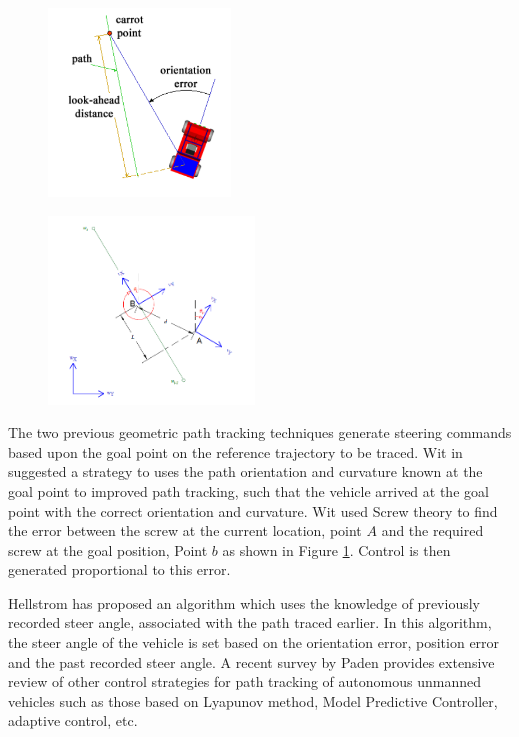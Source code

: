  \begin{figure}
	\centering
	\begin{minipage}{.5\textwidth}
		\centering
		\includegraphics[height=5cm,keepaspectratio]{Chapter2/fig/FollowTheCarrot}
		\label{fig:FollowCarrot}
	\end{minipage}%
	\begin{minipage}{.5\textwidth}
		\centering
		\includegraphics[width=1\linewidth,height=5cm,keepaspectratio]{Chapter2/fig/VectorPursuit}
		\label{fig:VectorPursuit}
	\end{minipage}
\end{figure}
 The two previous geometric path tracking techniques  generate steering commands based upon the goal point on the reference trajectory to be traced. 
 Wit in \cite{wit2004autonomous} suggested a strategy to uses the path orientation and curvature  known at the goal point to improved path tracking,  such that the vehicle arrived at the goal point  with the correct orientation and curvature. Wit used Screw theory to find the error between the screw at the current location, point $A$  and the required screw at the goal position, Point $b$ as shown in Figure \ref{fig:VectorPursuit}. Control is then generated proportional to this error.

Hellstrom \cite{hellstrom2006follow} has proposed an algorithm which uses the knowledge of previously recorded steer angle, associated with  the path traced earlier. In this algorithm, the steer angle of the vehicle is set based on the orientation error, position error and the past recorded steer angle. A recent survey by Paden \cite{paden2016survey} provides extensive review of other control strategies for path tracking of autonomous unmanned vehicles such as those based on Lyapunov method, Model Predictive Controller, adaptive control, etc. 


